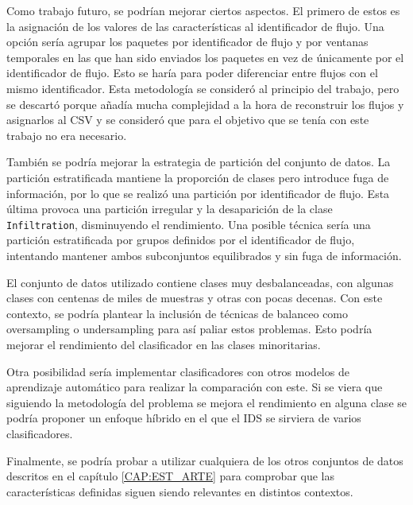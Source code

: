 Como trabajo futuro, se podrían mejorar ciertos aspectos. El primero de estos es la asignación de los valores de las características al identificador de flujo. Una opción sería agrupar los paquetes por identificador de flujo y por ventanas temporales en las que han sido enviados los paquetes en vez de únicamente por el identificador de flujo. Esto se haría para poder diferenciar entre flujos con el mismo identificador. Esta metodología se consideró al principio del trabajo, pero se descartó porque añadía mucha complejidad a la hora de reconstruir los flujos y asignarlos al CSV y se consideró que para el objetivo que se tenía con este trabajo no era necesario.

También se podría mejorar la estrategia de partición del conjunto de datos. La partición estratificada mantiene la proporción de clases pero introduce fuga de información, por lo que se realizó una partición por identificador de flujo. Esta última provoca una partición irregular y la desaparición de la clase \texttt{Infiltration}, disminuyendo el rendimiento. Una posible técnica sería una partición estratificada por grupos definidos por el identificador de flujo, intentando mantener ambos subconjuntos equilibrados y sin fuga de información. 

El conjunto de datos utilizado contiene clases muy desbalanceadas, con algunas clases con centenas de miles de muestras y otras con pocas decenas. Con este contexto, se podría plantear la inclusión de técnicas de balanceo como oversampling o undersampling para así paliar estos problemas. Esto podría mejorar el rendimiento del clasificador en las clases minoritarias.

Otra posibilidad sería implementar clasificadores con otros modelos de aprendizaje automático para realizar la comparación con este. Si se viera que siguiendo la metodología del problema se mejora el rendimiento en alguna clase se podría proponer un enfoque híbrido en el que el IDS se sirviera de varios clasificadores.

Finalmente, se podría probar a utilizar cualquiera de los otros conjuntos de datos descritos en el capítulo \ref{CAP:EST_ARTE} para comprobar que las características definidas siguen siendo relevantes en distintos contextos.


